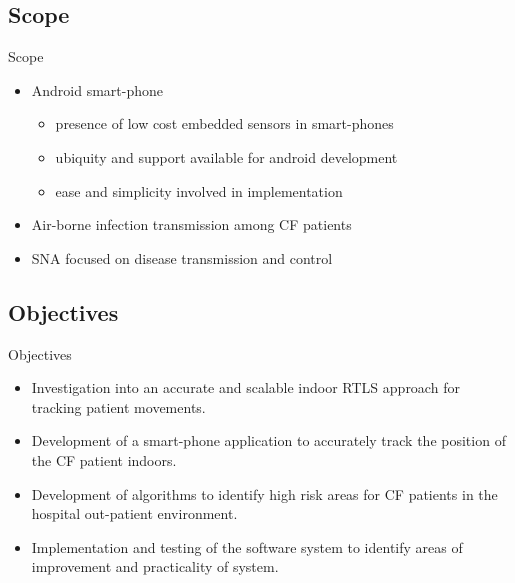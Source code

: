 \subsection{Scope} \label{ssec:intro_scope}
\begin{frame}{Scope}

	\begin{itemize}[<+-| alert@+>]
      \item Android smart-phone
      	\begin{itemize}
			\item presence of low cost embedded sensors in smart-phones
            \item ubiquity and support available for android development
            \item ease and simplicity involved in implementation
	   	\end{itemize}
      \item Air-borne infection transmission among CF patients
      \item SNA focused on disease transmission and control
  	\end{itemize}

\end{frame}

\subsection{Objectives} \label{ssec:intro_obj}
\begin{frame}{Objectives}
	
	\begin{itemize}[<+-| alert@+>]
		\item Investigation into an accurate and scalable indoor RTLS approach for tracking patient movements.
		\item Development of a smart-phone application to accurately track the position of the CF patient indoors.
		\item Development of algorithms to identify high risk areas for CF patients in the hospital out-patient environment.
		\item Implementation and testing of the software system to identify areas of improvement and practicality of system.
	\end{itemize}
	
\end{frame}
